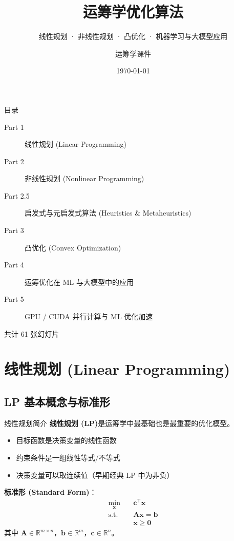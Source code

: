 \documentclass[11pt, aspectratio=169, svgnames, table, fontset=fandol]{ctexbeamer}
\title{\textbf{运筹学优化算法}}
\subtitle{线性规划 · 非线性规划 · 凸优化 · 机器学习与大模型应用}
\author{运筹学课件}
\institute{Operations Research \& Optimization}
\date{\today}
\newcommand{\R}{\mathbb{R}}
\begin{document}
\begin{frame}
  \titlepage
\end{frame}

\begin{frame}{目录}
  \begin{description}
    \item[Part 1] 线性规划 (Linear Programming)
    \item[Part 2] 非线性规划 (Nonlinear Programming)
    \item[Part 2.5] 启发式与元启发式算法 (Heuristics \& Metaheuristics)
    \item[Part 3] 凸优化 (Convex Optimization)
    \item[Part 4] 运筹优化在 ML 与大模型中的应用
    \item[Part 5] GPU / CUDA 并行计算与 ML 优化加速
  \end{description}

  \vspace{6pt}
  \begin{center}
    \small 共计 61 张幻灯片
  \end{center}
\end{frame}

\section{线性规划 (Linear Programming)}

\subsection{LP 基本概念与标准形}

\begin{frame}{线性规划简介}
  \textbf{线性规划 (LP)}是运筹学中最基础也是最重要的优化模型。
  \begin{itemize}
    \item 目标函数是决策变量的线性函数
    \item 约束条件是一组线性等式/不等式
    \item 决策变量可以取连续值（早期经典 LP 中为非负）
  \end{itemize}

  \vspace{6pt}
  \textbf{标准形 (Standard Form)}：
  \begin{align*}
    \min_{\bm{x}} \quad & \bm{c}^\top \bm{x} \\
    \text{s.t.} \quad  & \bm{A} \bm{x} = \bm{b} \\
                       & \bm{x} \geq \bm{0}
  \end{align*}
  其中 $\bm{A} \in \R^{m \times n}$，$\bm{b} \in \R^m$，$\bm{c} \in \R^n$。
\end{frame}
\end{document}
